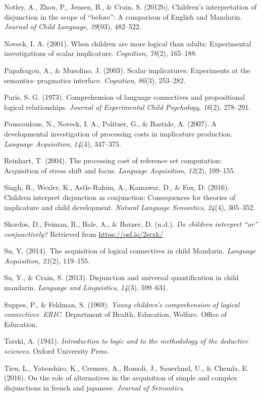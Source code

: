 \documentclass[,man,floatsintext]{apa6}
\begin{document}
\leavevmode\hypertarget{ref-notley2012children}{}%
Notley, A., Zhou, P., Jensen, B., \& Crain, S. (2012b). Children's interpretation of disjunction in the scope of ``before'': A comparison of English and Mandarin. \emph{Journal of Child Language}, \emph{39}(03), 482--522.

\leavevmode\hypertarget{ref-noveck2001children}{}%
Noveck, I. A. (2001). When children are more logical than adults: Experimental investigations of scalar implicature. \emph{Cognition}, \emph{78}(2), 165--188.

\leavevmode\hypertarget{ref-papafragou2003scalar}{}%
Papafragou, A., \& Musolino, J. (2003). Scalar implicatures: Experiments at the semantics--pragmatics interface. \emph{Cognition}, \emph{86}(3), 253--282.

\leavevmode\hypertarget{ref-paris1973comprehension}{}%
Paris, S. G. (1973). Comprehension of language connectives and propositional logical relationships. \emph{Journal of Experimental Child Psychology}, \emph{16}(2), 278--291.

\leavevmode\hypertarget{ref-pouscoulous2007developmental}{}%
Pouscoulous, N., Noveck, I. A., Politzer, G., \& Bastide, A. (2007). A developmental investigation of processing costs in implicature production. \emph{Language Acquisition}, \emph{14}(4), 347--375.

\leavevmode\hypertarget{ref-reinhart2004processing}{}%
Reinhart, T. (2004). The processing cost of reference set computation: Acquisition of stress shift and focus. \emph{Language Acquisition}, \emph{12}(2), 109--155.

\leavevmode\hypertarget{ref-Singh2016}{}%
Singh, R., Wexler, K., Astle-Rahim, A., Kamawar, D., \& Fox, D. (2016). Children interpret disjunction as conjunction: Consequences for theories of implicature and child development. \emph{Natural Language Semantics}, \emph{24}(4), 305--352.

\leavevmode\hypertarget{ref-skordosEtal2018}{}%
Skordos, D., Feiman, R., Bale, A., \& Barner, D. (n.d.). \emph{Do children interpret ``or'' conjunctively?} Retrieved from \url{https://osf.io/2srxk/}

\leavevmode\hypertarget{ref-su2014acquisition}{}%
Su, Y. (2014). The acquisition of logical connectives in child Mandarin. \emph{Language Acquisition}, \emph{21}(2), 119--155.

\leavevmode\hypertarget{ref-su2013disjunction}{}%
Su, Y., \& Crain, S. (2013). Disjunction and universal quantification in child mandarin. \emph{Language and Linguistics}, \emph{14}(3), 599--631.

\leavevmode\hypertarget{ref-suppes1969young}{}%
Suppes, P., \& Feldman, S. (1969). \emph{Young children's comprehension of logical connectives.} \emph{ERIC}. Department of Health, Education, Welfare. Office of Education.

\leavevmode\hypertarget{ref-tarski1941logic}{}%
Tarski, A. (1941). \emph{Introduction to logic and to the methodology of the deductive sciences}. Oxford University Press.

\leavevmode\hypertarget{ref-tieu2016}{}%
Tieu, L., Yatsushiro, K., Cremers, A., Romoli, J., Sauerland, U., \& Chemla, E. (2016). On the role of alternatives in the acquisition of simple and complex disjunctions in french and japanese. \emph{Journal of Semantics}.
\end{document}
